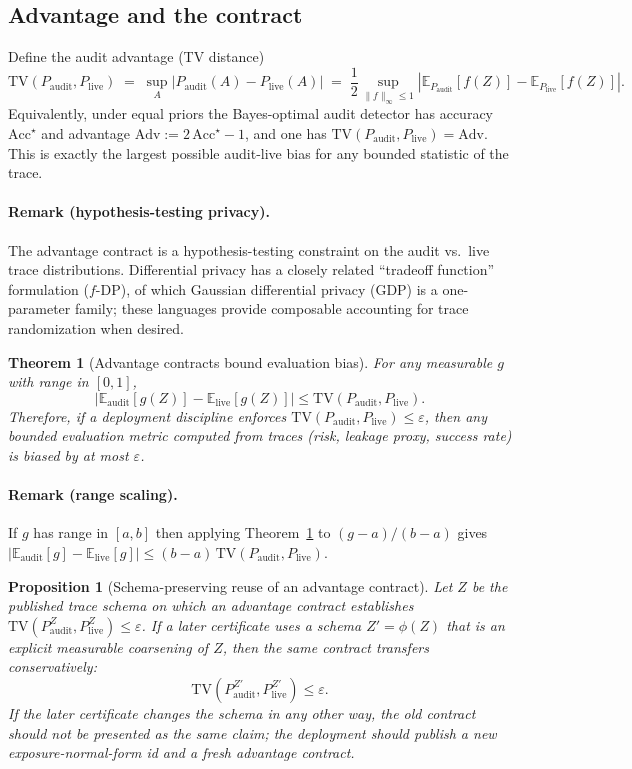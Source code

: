\documentclass[11pt]{article}
\newtheorem{theorem}{Theorem}
\newtheorem{proposition}{Proposition}
\newcommand{\TV}{\mathrm{TV}}
\newcommand{\E}{\mathbb{E}}
\begin{document}
\subsection{Advantage and the contract}
Define the audit advantage (TV distance)
\[
\TV(P_{\mathrm{audit}},P_{\mathrm{live}})
\;=\; \sup_{A} \left|P_{\mathrm{audit}}(A)-P_{\mathrm{live}}(A)\right|
\;=\; \frac12 \sup_{\|f\|_{\infty}\le 1} \left|\E_{P_{\mathrm{audit}}}[f(Z)] - \E_{P_{\mathrm{live}}}[f(Z)]\right|.
\]
Equivalently, under equal priors the Bayes-optimal audit detector has accuracy $\mathrm{Acc}^\star$ and advantage $\mathrm{Adv} := 2\,\mathrm{Acc}^\star-1$, and one has $\TV(P_{\mathrm{audit}},P_{\mathrm{live}})=\mathrm{Adv}$.
This is exactly the largest possible audit-live bias for any bounded statistic of the trace.

\paragraph{Remark (hypothesis-testing privacy).}
The advantage contract is a hypothesis-testing constraint on the audit vs.~live trace distributions.
Differential privacy has a closely related ``tradeoff function'' formulation ($f$-DP), of which Gaussian differential privacy (GDP) is a one-parameter family; these languages provide composable accounting for trace randomization when desired.\cite{dong2022gdp}

\begin{theorem}[Advantage contracts bound evaluation bias]\label{thm:adv_contract}
For any measurable $g$ with range in $[0,1]$,
\[
\left|\E_{\mathrm{audit}}[g(Z)] - \E_{\mathrm{live}}[g(Z)]\right| \le \TV(P_{\mathrm{audit}},P_{\mathrm{live}}).
\]
Therefore, if a deployment discipline enforces $\TV(P_{\mathrm{audit}},P_{\mathrm{live}})\le \varepsilon$,
then any bounded evaluation metric computed from traces (risk, leakage proxy, success rate) is biased by at most $\varepsilon$.
\end{theorem}

\paragraph{Remark (range scaling).} If $g$ has range in $[a,b]$ then applying Theorem~\ref{thm:adv_contract} to $(g-a)/(b-a)$ gives $|\E_{\mathrm{audit}}[g]-\E_{\mathrm{live}}[g]|\le (b-a)\,\TV(P_{\mathrm{audit}},P_{\mathrm{live}})$.

\begin{proposition}[Schema-preserving reuse of an advantage contract]\label{prop:reuse_adv}
Let $Z$ be the published trace schema on which an advantage contract establishes $\TV(P_{\mathrm{audit}}^Z,P_{\mathrm{live}}^Z)\le \varepsilon$.
If a later certificate uses a schema $Z' = \phi(Z)$ that is an explicit measurable coarsening of $Z$, then the same contract transfers conservatively:
\[
\TV(P_{\mathrm{audit}}^{Z'},P_{\mathrm{live}}^{Z'}) \le \varepsilon.
\]
If the later certificate changes the schema in any other way, the old contract should not be presented as the same claim; the deployment should publish a new exposure-normal-form id and a fresh advantage contract.
\end{proposition}
\end{document}
